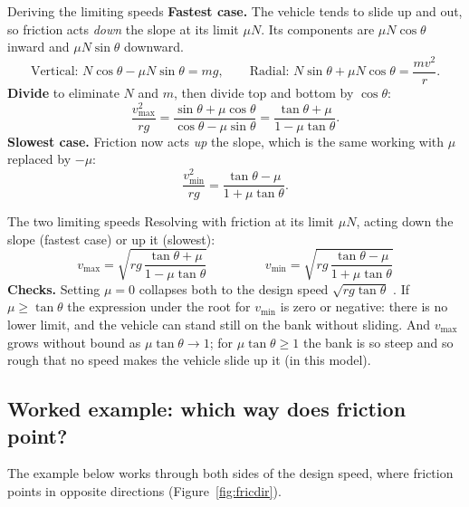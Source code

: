 \begin{derivbox}{Deriving the limiting speeds}
 \textbf{Fastest case.} The vehicle tends to slide up and out, so friction acts \emph{down} the
slope at its limit $\mu N$. Its components are $\mu N\cos\theta$ inward and $\mu N\sin\theta$ downward.
\[
\text{Vertical: } N\cos\theta-\mu N\sin\theta=mg,
\qquad
\text{Radial: } N\sin\theta+\mu N\cos\theta=\frac{mv^{2}}{r}.
\]
 \textbf{Divide} to eliminate $N$ and $m$, then divide top and bottom by $\cos\theta$:
\[
\frac{v_{\max}^{2}}{rg}=\frac{\sin\theta+\mu\cos\theta}{\cos\theta-\mu\sin\theta}
=\frac{\tan\theta+\mu}{1-\mu\tan\theta}.
\]
 \textbf{Slowest case.} Friction now acts \emph{up} the slope, which is the same working with
$\mu$ replaced by $-\mu$:
\[
\frac{v_{\min}^{2}}{rg}=\frac{\tan\theta-\mu}{1+\mu\tan\theta}.
\]
\end{derivbox}

\begin{keybox}{The two limiting speeds}
Resolving with friction at its limit $\mu N$, acting down the slope (fastest case) or up it (slowest):
\[
\boxed{\;v_{\max}=\sqrt{rg\,\frac{\tan\theta+\mu}{1-\mu\tan\theta}}\;}
\qquad\qquad
\boxed{\;v_{\min}=\sqrt{rg\,\frac{\tan\theta-\mu}{1+\mu\tan\theta}}\;}
\]
\textbf{Checks.} Setting $\mu=0$ collapses both to the design speed $\sqrt{rg\tan\theta}$ \checkmark.
If $\mu\ge\tan\theta$ the expression under the root for $v_{\min}$ is zero or negative: there is no
lower limit, and the vehicle can stand still on the bank without sliding. And $v_{\max}$ grows without
bound as $\mu\tan\theta\to1$; for $\mu\tan\theta\ge1$ the bank is so steep and so rough that no
speed makes the vehicle slide up it (in this model).
\end{keybox}

\subsection{Worked example: which way does friction point?}

The example below works through both sides of the design speed, where friction points in opposite
directions (Figure~\ref{fig:fricdir}).

\begin{figure}[htbp]
\centering
{}
\end{figure}

